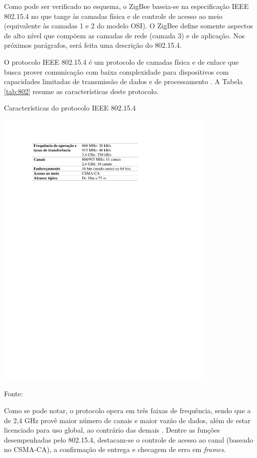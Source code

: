 Como pode ser verificado no esquema, o ZigBee baseia-se na especificação IEEE 802.15.4 no que tange às camadas física e de controle de acesso ao meio (equivalente às camadas 1 e 2 do modelo OSI). O ZigBee define somente aspectos de alto nível que compõem as camadas de rede (camada 3) e de aplicação. Nos próximos parágrafos, será feita uma descrição do 802.15.4.

O protocolo IEEE 802.15.4 é um protocolo de camadas física e de enlace que busca prover comunicação com baixa complexidade para dispositivos com capacidades limitadas de transmissão de dados e de processamento \cite{ieee802_15}. A Tabela \ref{tab:802} resume as características deste protocolo.

\begin{table}[h]
	\centering
	\caption{Características do protocolo IEEE 802.15.4}\smallskip
	\label{tab:802}
	\includegraphics[width=0.8\textwidth]{tabelas/802_15_4.pdf}
	
	Fonte: \cite{stevanovic2007, schonwalder2010}
\end{table}
Como se pode notar, o protocolo opera em três faixas de frequência, sendo que a de 2,4 GHz provê maior número de canais e maior vazão de dados, além de estar licenciado para uso global, ao contrário das demais \cite{schonwalder2010}. Dentre as funções desempenhadas pelo 802.15.4, destacam-se o controle de acesso ao canal (baseado no CSMA-CA), a confirmação de entrega e checagem de erro em \textit{frames}.

